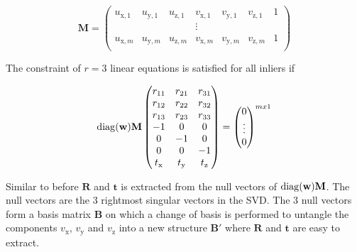 \begin{equation}
\textbf{M}=
\begin{pmatrix}
u_{\mathrm{x},1} & u_{\mathrm{y},1} & u_{\mathrm{z},1} & v_{\mathrm{x},1} & v_{\mathrm{y},1} & v_{\mathrm{z},1} & 1 \\
 & & & \vdots & & & \\
u_{\mathrm{x},m} & u_{\mathrm{y},m} & u_{\mathrm{z},m} & v_{\mathrm{x},m} & v_{\mathrm{y},m} & v_{\mathrm{z},m} & 1 \\
\end{pmatrix}
\end{equation}

The constraint of $r=3$ linear equations is satisfied for all inliers if

\begin{equation}
\operatorname{diag}(\textbf{w})
\textbf{M}
\begin{pmatrix}
r_{11} & r_{21} & r_{31} \\
r_{12} & r_{22} & r_{32} \\
r_{13} & r_{23} & r_{33} \\
-1 & 0 & 0 \\
0 & -1 & 0 \\
0 & 0 & -1 \\
t_\mathrm{x} & t_\mathrm{y} & t_\mathrm{z} \\
\end{pmatrix}
=
\begin{pmatrix}
0 \\
\vdots \\
0 \\
\end{pmatrix}
^{mx1}
\end{equation}

Similar to before $\textbf{R}$ and $\textbf{t}$ is extracted from the null vectors of $\operatorname{diag}(\textbf{w})\textbf{M}$. The null vectors are the 3 rightmost singular vectors in the SVD. The 3 null vectors form a basis matrix $\textbf{B}$ on which a change of basis is performed to untangle the components $v_\mathrm{x}$, $v_\mathrm{y}$ and $v_\mathrm{z}$ into a new structure $\textbf{B}'$ where $\textbf{R}$ and $\textbf{t}$ are easy to extract.

